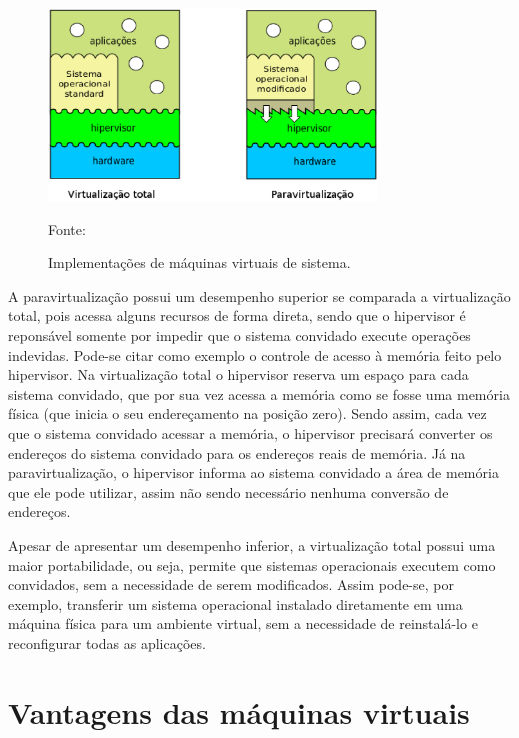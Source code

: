 \begin{figure}[h!]
 \centering
 \includegraphics[width=330px]{img/vms_implementacao.eps}
 \caption{Implementações de máquinas virtuais de sistema.}
 \label{fig:vms_implementacao}
 Fonte: \citet{maziero2013}
\end{figure}

A paravirtualização possui um desempenho superior se comparada a virtualização total, pois acessa alguns recursos de forma direta, sendo que 
o hipervisor é reponsável somente por impedir que o sistema convidado execute operações indevidas. Pode-se citar como exemplo o controle de
acesso à memória feito pelo hipervisor. Na virtualização total o hipervisor reserva um espaço para cada sistema convidado, que por sua vez 
acessa a memória como se fosse uma memória física (que inicia o seu endereçamento na posição zero). Sendo assim, cada vez que o sistema convidado 
acessar a memória, o hipervisor precisará converter os endereços do sistema convidado para os endereços reais de memória. Já na paravirtualização, 
o hipervisor informa ao sistema convidado a área de memória que ele pode utilizar, assim não sendo necessário nenhuma conversão de endereços.

Apesar de apresentar um desempenho inferior, a virtualização total possui uma maior portabilidade, ou seja, permite que sistemas operacionais 
executem como convidados, sem a necessidade de serem modificados. Assim pode-se, por exemplo, transferir um sistema operacional instalado 
diretamente em uma máquina física para um ambiente virtual, sem a necessidade de reinstalá-lo e reconfigurar todas as aplicações.


\section{Vantagens das máquinas virtuais}
\label{section:virtvantag}

